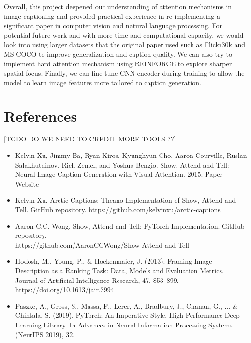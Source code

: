 \documentclass{article}
\begin{document}
Overall, this project deepened our understanding of attention mechanisms in image captioning and provided practical experience in re-implementing a significant paper in computer vision and natural language processing. For potential future work and with more time and computational capacity, we would look into using larger datasets that the original paper used such as Flickr30k and MS COCO to improve generalization and caption quality. We can also try to implement hard attention mechanism using REINFORCE to explore sharper spatial focus. Finally, we can fine-tune CNN encoder during training to allow the model to learn image features more tailored to caption generation.


\section{References}

[TODO DO WE NEED TO CREDIT MORE TOOLS ??]
\begin{itemize}
    \item Kelvin Xu, Jimmy Ba, Ryan Kiros, Kyunghyun Cho, Aaron Courville, Ruslan Salakhutdinov, Rich Zemel, and Yoshua Bengio. Show, Attend and Tell: Neural Image Caption Generation with Visual Attention. 2015. Paper Website
    \item Kelvin Xu. Arctic Captions: Theano Implementation of Show, Attend and Tell. GitHub repository. https://github.com/kelvinxu/arctic-captions 
    \item Aaron C.C. Wong. Show, Attend and Tell: PyTorch Implementation. GitHub repository. \\ https://github.com/AaronCCWong/Show-Attend-and-Tell
    \item Hodosh, M., Young, P., \& Hockenmaier, J. (2013). Framing Image Description as a Ranking Task: Data, Models and Evaluation Metrics. Journal of Artificial Intelligence Research, 47, 853–899.\\ https://doi.org/10.1613/jair.3994
    \item Paszke, A., Gross, S., Massa, F., Lerer, A., Bradbury, J., Chanan, G., ... \& Chintala, S. (2019). PyTorch: An Imperative Style, High-Performance Deep Learning Library. In Advances in Neural Information Processing Systems (NeurIPS 2019), 32.
\end{itemize}
\end{document}
